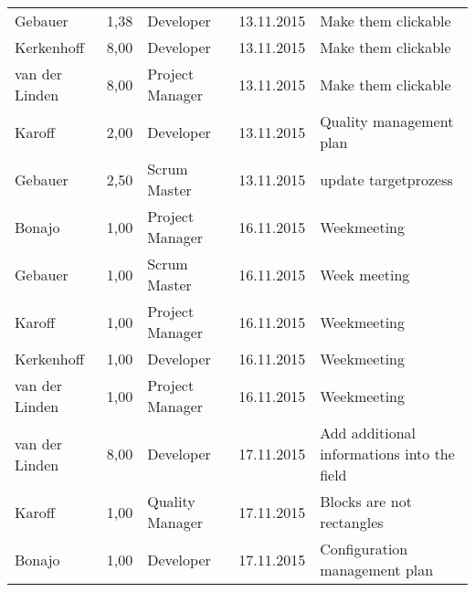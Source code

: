 \begin{longtable}{ l r p{2cm} c p{4cm} }
		Gebauer                 & 1,38           & Developer             & 13.11.2015    & Make them clickable                                                             \\
		Kerkenhoff              & 8,00           & Developer             & 13.11.2015    & Make them clickable                                                             \\
		van der Linden          & 8,00           & Project Manager       & 13.11.2015    & Make them clickable                                                             \\
		Karoff                  & 2,00           & Developer             & 13.11.2015    & Quality management plan                                                         \\
		Gebauer                 & 2,50           & Scrum Master          & 13.11.2015    & update targetprozess                                                            \\
		Bonajo                  & 1,00           & Project Manager       & 16.11.2015    & Weekmeeting                                                                     \\
		Gebauer                 & 1,00           & Scrum Master          & 16.11.2015    & Week meeting                                                                     \\
		Karoff                  & 1,00           & Project Manager       & 16.11.2015    & Weekmeeting                                                                     \\
		Kerkenhoff              & 1,00           & Developer             & 16.11.2015    & Weekmeeting                                                                     \\
		van der Linden          & 1,00           & Project Manager       & 16.11.2015    & Weekmeeting                                                                     \\
		van der Linden          & 8,00           & Developer             & 17.11.2015    & Add additional informations into the field                                      \\
		Karoff                  & 1,00           & Quality Manager       & 17.11.2015    & Blocks are not rectangles                                                       \\
		Bonajo                  & 1,00           & Developer             & 17.11.2015    & Configuration management plan                                                   \\

\end{longtable}
